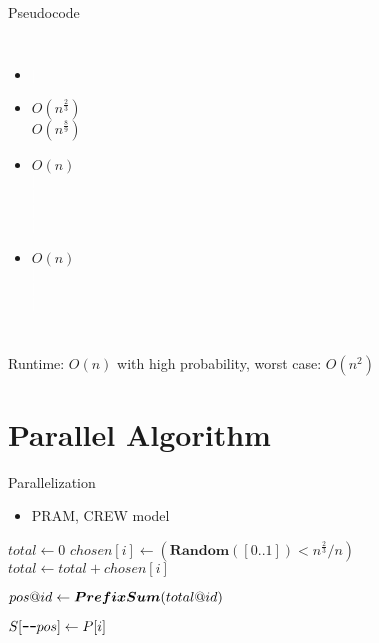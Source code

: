 \documentclass[18pt]{beamer}
\begin{document}
\begin{frame}{Pseudocode}
\begin{columns}
		\begin{itemize}\itemsep0pt
			\item[] \textcolor{white}{$|$}\\
			\vspace{8pt}
			\item[]$O(n^{\frac{2}{3}})$\\ $O(n^{\frac{8}{9}})$ \\ 					
			\item[]$O(n)$\\\textcolor{white}{$|$} \\\textcolor{white}{$|$} \\ \textcolor{white}{$|$}\\  \textcolor{white}{$|$}\\
			\item[]$O(n)$\\\textcolor{white}{$|$} \\ \textcolor{white}{$|$} \\\textcolor{white}{$|$}\\
		\end{itemize}
\end{columns}
\vspace{2ex}
Runtime: $O(n)$ with high probability, worst case: $O(n^2)$
\end{frame}
\section{Parallel Algorithm}
\begin{frame}{Parallelization}
\begin{itemize}
\item PRAM, CREW model
\end{itemize}

\begin{algorithmic}[1]
\State $total \gets 0$
	\State $chosen[i] \gets (\boldsymbol{Random}([0..1]) < n^\frac{2}{3}/n)$
	\State $total \gets total + chosen[i]$ 
\EndFor

\State $pos \text{@} id \gets \boldsymbol{PrefixSum}(total \text{@} id)$ 

 
	\State $S[\texttt{-} \texttt{-} pos] \gets P[i]$
	\EndIf
\EndFor
\EndProcedure
\end{algorithmic}
\end{frame}
\end{document}
